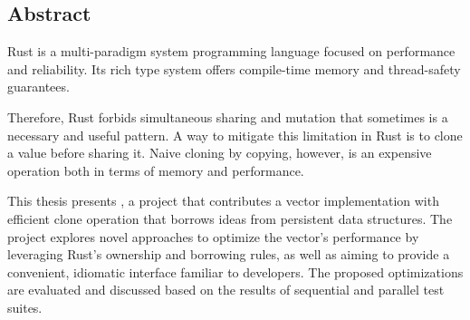 \vspace*{2cm}
\thispagestyle{plain}

{}

\begin{center}
\section*{Abstract}
\end{center}

Rust is a multi-paradigm system programming language focused on performance and reliability. Its rich type system offers compile-time memory and thread-safety guarantees.

Therefore, Rust forbids simultaneous sharing and mutation that sometimes is a necessary and useful pattern. A way to mitigate this limitation in Rust is to clone a value before sharing it. Naive cloning by copying, however, is an expensive operation both in terms of memory and performance.

This thesis presents \pvecrs{}, a project that contributes a vector implementation with efficient clone operation that borrows ideas from persistent data structures. The project explores novel approaches to optimize the vector's performance by leveraging Rust's ownership and borrowing rules, as well as aiming to provide a convenient, idiomatic interface familiar to developers. The proposed optimizations are evaluated and discussed based on the results of sequential and parallel test suites.
